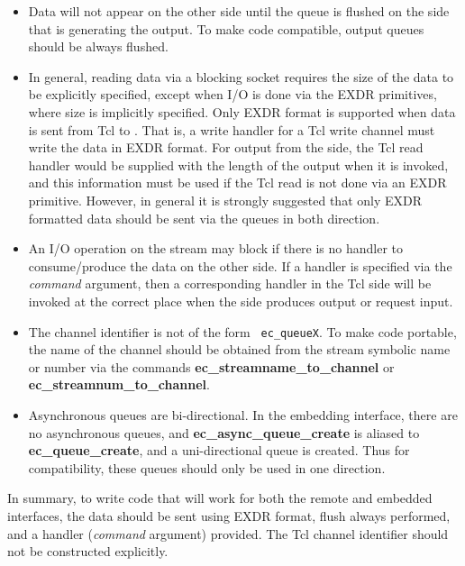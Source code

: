 \begin{itemize}

\item Data will not appear on the other side until the queue is
      flushed on the side that is generating the output. To make code
      compatible, output queues should be always flushed.

\item In general, reading data via a blocking socket requires the
      size of the data to be explicitly specified, except when I/O is done
      via the EXDR primitives, where size is implicitly specified. Only
      EXDR format is supported when data is sent from Tcl to {\eclipse}.
      That is, a write handler for a Tcl write channel must write the data
      in EXDR format. For output from the {\eclipse} side, the Tcl read
      handler would be supplied with the length of the output when it is
      invoked, and this information must be used if the Tcl read is not
      done via an EXDR primitive. However, in general it is strongly
      suggested that only EXDR formatted data should be sent via the queues
      in both direction.

\item An I/O operation on the stream may block if there is no 
      handler to consume/produce the data on the other side. If a handler
      is specified via the {\it command} argument, then a corresponding
      handler in the Tcl side will be invoked at the correct place when the
      {\eclipse} side produces output or request input.

\item The  channel identifier is not of the form {\tt
      ec_queueX}. To make code portable, the name of the channel should be
      obtained from the {\eclipse} stream symbolic name or number via the
      commands {\bf ec_streamname_to_channel} or {\bf
      ec_streamnum_to_channel}.

\item Asynchronous queues are bi-directional. In the embedding interface,
      there are no asynchronous queues, and {\bf ec_async_queue_create} is
      aliased to {\bf ec_queue_create}, and a uni-directional queue is
      created. Thus for compatibility, these queues should only be used
      in one direction. 
\end{itemize}

In summary, to write code that will work for both the remote and embedded
interfaces, the data should be sent using EXDR format, flush always
performed, and a handler ({\it command\/} argument) provided. The Tcl
channel identifier should not be constructed explicitly.

